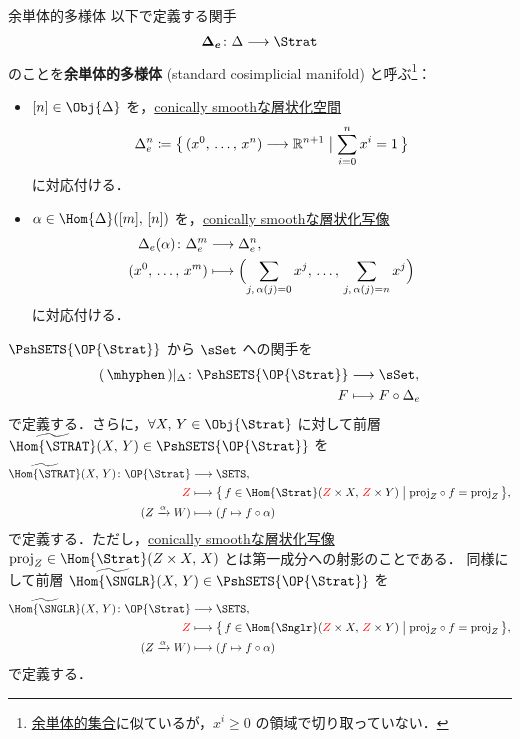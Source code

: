 \documentclass[TQFT_main]{subfiles}
\begin{document}
\begin{mydef}[label=def:standard-cosimplicial-mfd]{余単体的多様体}
    以下で定義する関手
    \begin{align}
        \bm{\Delta_e} \colon \Delta \lto \Strat
    \end{align}
    のことを\textbf{余単体的多様体} (standard cosimplicial manifold) と呼ぶ\footnote{\hyperref[def:simplicial-to]{余単体的集合}に似ているが，$x^i \ge 0$ の領域で切り取っていない．}：
    \begin{itemize}
        \item $[n] \in \Obj{\Delta}$ を，\hyperref[def:c-smooth]{conically smoothな層状化空間}
        \begin{align}
            \Delta_e^n \coloneqq \bigl\{\, (x^0,\, \dots,\, x^n) \longrightarrow \mathbb{R}^{n+1} \bigm| \sum_{i=0}^n x^i = 1 \,\bigr\} 
        \end{align}
        に対応付ける．
        \item $\alpha \in \Hom{\Delta}([m],\, [n])$ を，\hyperref[def:c-smooth-map]{conically smoothな層状化写像}
        \begin{align}
            \Delta_e(\alpha) \colon \Delta_e^m &\longrightarrow \Delta_e^n, \\
            (x^0,\, \dots,\, x^m) &\longmapsto \Bigl( \sum_{j,\, \alpha(j) = 0} x^j,\, \dots,\, \sum_{j,\, \alpha(j) = n} x^j \Bigr)
        \end{align}
        に対応付ける．
    \end{itemize}
\end{mydef}

$\PshSETS{\OP{\Strat}}$ から $\sSet$ への関手を
\begin{align}
    (\, \mhyphen \,)|_{\Delta} \colon \PshSETS{\OP{\Strat}} &\lto \sSet, \\
    F &\lmto F \circ \Delta_e
\end{align}
で定義する．さらに，$\forall X,\, Y \in \Obj{\Strat}$ に対して前層 $\widetilde{\Hom{\STRAT}} (X,\, Y) \in \PshSETS{\OP{\Strat}}$ を
\begin{align}
    \widetilde{\Hom{\STRAT}} (X,\, Y) \colon \OP{\Strat} &\lto \SETS, \\
    \textcolor{red}{Z} &\lmto \bigl\{\, f \in \Hom{\Strat}(\textcolor{red}{Z} \times X,\, \textcolor{red}{Z} \times Y) \bigm| \mathrm{proj}_Z \circ f = \mathrm{proj}_Z \,\bigr\}, \\
    (Z \xrightarrow{\alpha} W) &\lmto (f \mapsto f \circ \alpha)
\end{align}
で定義する．ただし，\hyperref[def:c-smooth-map]{conically smoothな層状化写像} $\mathrm{proj}_Z \in \Hom{\Strat}(Z \times X,\, X)$ とは第一成分への射影のことである．
同様にして前層 $\widetilde{\Hom{\SNGLR}} (X,\, Y) \in \PshSETS{\OP{\Strat}}$ を
\begin{align}
    \widetilde{\Hom{\SNGLR}} (X,\, Y) \colon \OP{\Strat} &\lto \SETS, \\
    \textcolor{red}{Z} &\lmto \bigl\{\, f \in \Hom{\Snglr}(\textcolor{red}{Z} \times X,\, \textcolor{red}{Z} \times Y) \bigm| \mathrm{proj}_Z \circ f = \mathrm{proj}_Z \,\bigr\}, \\
    (Z \xrightarrow{\alpha} W) &\lmto (f \mapsto f \circ \alpha)
\end{align}
で定義する．
\end{document}
